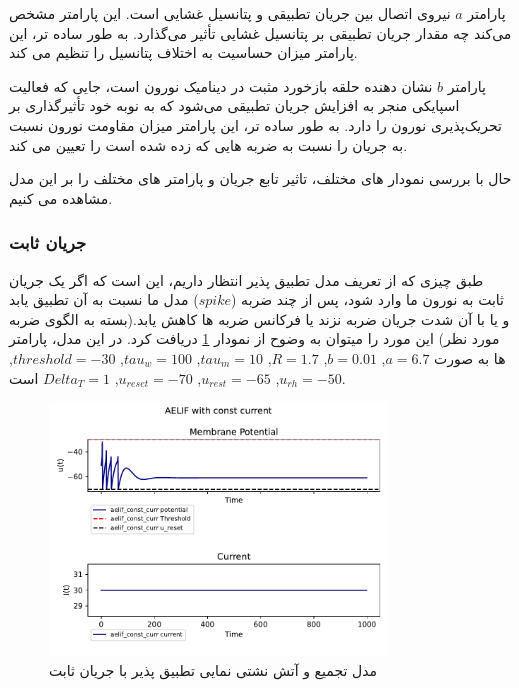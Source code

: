 \documentclass{article}
\begin{document}
            پارامتر 
            $a$ 
            نیروی اتصال بین جریان تطبیقی و پتانسیل غشایی است. این پارامتر مشخص می‌کند چه مقدار جریان تطبیقی بر پتانسیل غشایی تأثیر می‌گذارد. به طور ساده تر، این پارامتر میزان حساسیت به اختلاف پتانسیل را تنظیم می کند.

            پارامتر 
            $b$ 
            نشان دهنده حلقه بازخورد مثبت در دینامیک نورون است، جایی که فعالیت اسپایکی منجر به افزایش جریان تطبیقی می‌شود که به نوبه خود تأثیرگذاری بر تحریک‌پذیری نورون را دارد. به طور ساده تر، این پارامتر میزان مقاومت نورون نسبت به جریان را نسبت به ضربه هایی که زده شده است را تعیین می کند.

            حال با بررسی نمودار های مختلف، تاثیر تابع جریان و پارامتر های مختلف را بر این مدل مشاهده می کنیم.
            \subsubsection{جریان ثابت}
                طبق چیزی که از تعریف مدل تطبیق پذیر انتظار داریم، این است که اگر یک جریان ثابت به نورون ما وارد شود، پس از چند ضربه
                ($spike$) 
                مدل ما نسبت به آن تطبیق یابد و یا با آن شدت جریان ضربه نزند یا فرکانس ضربه ها کاهش یابد.(بسته به الگوی ضربه مورد نظر) این مورد را میتوان به وضوح از نمودار 
                \ref{fig:aelif-const-curr} 
                دریافت کرد.
                در این مدل، پارامتر ها به صورت 
                $a=6.7$, 
                $b=0.01$, 
                $R=1.7$, 
                $tau_m=10$, 
                $tau_w=100$, 
                $threshold=-30$, 
                $u_{rh}=-50$, 
                $u_{rest}=-65$, 
                $u_{reset}=-70$, 
                $Delta_T=1$
                است. 
                \begin{figure}[H]
                    \centering
                    \includegraphics[width=0.8\textwidth]{plots/AELIF with const current.pdf} 
                    \caption{مدل تجمیع و آتش نشتی نمایی تطبیق پذیر با جریان ثابت}
                    \label{fig:aelif-const-curr}
                \end{figure}
                
\end{document}
